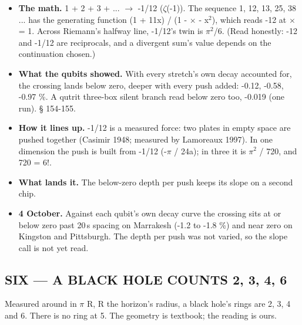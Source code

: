 \documentclass[11pt]{article}
\begin{document}
\begin{itemize}
\item \textbf{The math.} 1 + 2 + 3 + ... \(\to\) -1/12 (\(\zeta\)(-1)). The sequence 1, 12, 13, 25, 38 ... has the generating function (1 + 11x) / (1 - \(\times\) - x\(^{2}\)), which reads -12 at \(\times\) = 1. Across Riemann's halfway line, -1/12's twin is \(\pi\)\(^{2}\)/6. (Read honestly: -12 and -1/12 are reciprocals, and a divergent sum's value depends on the continuation chosen.)
\item \textbf{What the qubits showed.} With every stretch's own decay accounted for, the crossing lands below zero, deeper with every push added: -0.12, -0.58, -0.97 \%. A qutrit three-box silent branch read below zero too, -0.019 (one run). \S{} 154-155.
\item \textbf{How it lines up.} -1/12 is a measured force: two plates in empty space are pushed together (Casimir 1948; measured by Lamoreaux 1997). In one dimension the push is built from -1/12 (-\(\pi\) / 24a); in three it is \(\pi\)\(^{2}\) / 720, and 720 = 6!.
\item \textbf{What lands it.} The below-zero depth per push keeps its slope on a second chip.
\item \textbf{4 October.} Against each qubit's own decay curve the crossing sits at or below zero past 20\,\textmu s spacing on Marrakesh (-1.2 to -1.8 \%) and near zero on Kingston and Pittsburgh. The depth per push was not varied, so the slope call is not yet read.
\end{itemize}
\subsection{SIX --- A BLACK HOLE COUNTS 2, 3, 4, 6}
Measured around in \(\pi\) R, R the horizon's radius, a black hole's rings are 2, 3, 4 and 6. There is no ring at 5. The geometry is textbook; the reading is ours.
\end{document}
